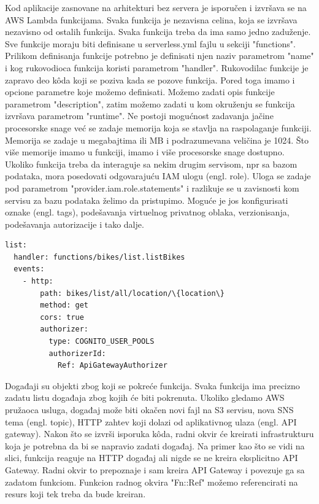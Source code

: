 \documentclass[12pt,oneside]{memoir}
\begin{document}
Kod aplikacije zasnovane na arhitekturi bez servera je isporučen i izvršava se na AWS Lambda funkcijama. Svaka funkcija je nezavisna celina, koja se izvršava nezavisno od ostalih funkcija. Svaka funkcija treba da ima samo jedno zaduženje. Sve funkcije moraju biti definisane u serverless.yml fajlu u sekciji "functions". Prilikom definisanja funkcije potrebno je definisati njen naziv parametrom "name" i kog rukovodioca funkcija koristi parametrom "handler". Rukovodilac funkcije je zapravo deo kôda koji se poziva kada se pozove funkcija. Pored toga imamo i opcione parametre koje možemo definisati. Možemo zadati opis funkcije parametrom "description", zatim možemo zadati u kom okruženju se funkcija izvršava parametrom "runtime". Ne postoji mogućnost zadavanja jačine procesorske snage već se zadaje memorija koja se stavlja na raspolaganje funkciji. Memorija se zadaje u megabajtima ili MB i podrazumevana veličina je 1024. Što više memorije imamo u funkciji, imamo i više procesorske snage dostupno. Ukoliko funkcija treba da interaguje sa nekim drugim servisom, npr sa bazom podataka, mora posedovati odgovarajuću IAM ulogu (engl. role). Uloga se zadaje pod parametrom "provider.iam.role.statements" i razlikuje se u zavisnosti kom servisu za bazu podataka želimo da pristupimo. Moguće je jos konfigurisati oznake (engl. tags), podešavanja virtuelnog privatnog oblaka, verzionisanja, podešavanja autorizacije i tako dalje.
 
\begin{lstlisting}
list:
  handler: functions/bikes/list.listBikes
  events:
    - http:
        path: bikes/list/all/location/\{location\}
        method: get
        cors: true
        authorizer:
          type: COGNITO_USER_POOLS
          authorizerId:
            Ref: ApiGatewayAuthorizer
\end{lstlisting}
 
Događaji su objekti zbog koji se pokreće funkcija. Svaka funkcija ima precizno zadatu listu događaja zbog kojih će biti pokrenuta. Ukoliko gledamo AWS pružaoca usluga, događaj može biti okačen novi fajl na S3 servisu, nova SNS tema (engl. topic), HTTP zahtev koji dolazi od aplikativnog ulaza (engl. API gateway). Nakon što se izvrši isporuka kôda, radni okvir će kreirati infrastrukturu koja je potrebna da bi se napravio zadati događaj. Na primer kao što se vidi na slici, funkcija reaguje na HTTP događaj ali nigde se ne kreira eksplicitno API Gateway. Radni okvir to prepoznaje i sam kreira API Gateway i povezuje ga sa zadatom funkciom. Funkcion radnog okvira "Fn::Ref" možemo referencirati na resurs koji tek treba da bude kreiran.
 
\end{document}

